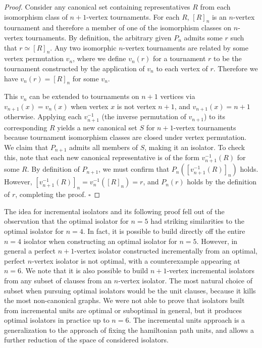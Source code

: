 \documentclass[a4paper,UKenglish,cleveref, autoref, thm-restate]{lipics-v2021}
\begin{document}
\begin{proof}
Consider any canonical set containing representatives $R$ from each isomorphism class of $n+1$-vertex tournaments. For each $R$, $[R]_n$ is an $n$-vertex tournament and therefore a member of one of the isomorphism classes on $n$-vertex tournaments. By definition, the arbitrary given $P_n$ admits some $r$ such that $r \simeq [R]_n$. Any two isomorphic $n$-vertex tournaments are related by some vertex permutation $v_n$, where we define $v_n(r)$ for a tournament $r$ to be the tournament constructed by the application of $v_n$ to each vertex of $r$. Therefore we have $v_n(r) = [R]_n$ for some $v_n$.

This $v_n$ can be extended to tournaments on $n+1$ vertices via $v_{n+1}(x) = v_n(x)$ when vertex $x$ is not vertex $n+1$, and $v_{n+1}(x) = n+1$ otherwise.  Applying each $v_{n+1}^{-1}$ (the inverse permutation of $v_{n+1}$) to its corresponding $R$ yields a new canonical set $S$ for $n+1$-vertex tournaments because tournament isomorphism classes are closed under vertex permutation. We claim that $P_{n+1}$ admits all members of $S$, making it an isolator. To check this, note that each new canonical representative is of the form $v_{n+1}^{-1}(R)$ for some $R$. By definition of $P_{n+1}$, we must confirm that $P_n([v_{n+1}^{-1}(R)]_n)$ holds. However, $[v_{n+1}^{-1}(R)]_n = v_n^{-1}([R]_n) = r$, and $P_n(r)$ holds by the definition of $r$, completing the proof. $\square$
\end{proof}

The idea for incremental isolators and its following proof fell out of the observation that the optimal isolator for $n=5$ had striking similarities to the optimal isolator for $n=4$. In fact, it is possible to build directly off the entire $n=4$ isolator when constructing an optimal isolator for $n=5$. However, in general a perfect $n+1$-vertex isolator constructed incrementally from an optimal, perfect $n$-vertex isolator is not optimal, with a counterexample appearing at $n=6$. We note that it is also possible to build $n+1$-vertex incremental isolators from any subset of clauses from an $n$-vertex isolator. The most natural choice of subset when pursuing optimal isolators would be the unit clauses, because it kills the most non-canonical graphs. We were not able to prove that isolators built from incremental units are optimal or suboptimal in general, but it produces optimal isolators in practice up to $n=6$. The incremental units approach is a generalization to the approach of fixing the hamiltonian path units, and allows a further reduction of the space of considered isolators.
\end{document}
